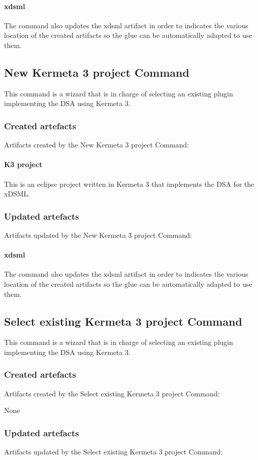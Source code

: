 \documentclass{gemoc} %
\begin{document}
\paragraph{xdsml} 
The command also updates the xdsml artifact in order to indicates the various location of the created artifacts so the glue can be automatically adapted to use them.

\subsection{New Kermeta 3 project Command}
This command is a wizard that is in charge of selecting an existing plugin implementing the DSA using Kermeta 3.
\subsubsection{Created artefacts}
Artifacts created by the New Kermeta 3 project Command:
\paragraph{K3 project} 
This is an eclipse project written in Kermeta 3 that implements the DSA for the xDSML.
\subsubsection{Updated artefacts}
Artifacts updated by the New Kermeta 3 project Command:
\paragraph{xdsml} 
The command also updates the xdsml artifact in order to indicates the various location of the created artifacts so the glue can be automatically adapted to use them.

\subsection{Select existing Kermeta 3 project Command}
This command is a wizard that is in charge of selecting an existing plugin implementing the DSA using Kermeta 3.
\subsubsection{Created artefacts}
Artifacts created by the Select existing Kermeta 3 project Command:

	None
\subsubsection{Updated artefacts}
Artifacts updated by the Select existing Kermeta 3 project Command:
\end{document}
